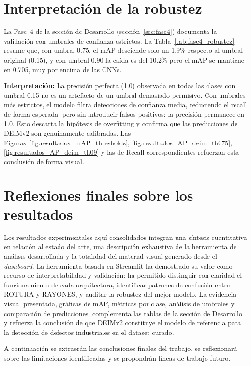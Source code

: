 \section{Interpretación de la robustez}
\label{sec:interpretacion_robustez}

La Fase~4 de la sección de Desarrollo (sección~\ref{sec:fase4}) documenta la validación con umbrales de confianza estrictos. La Tabla~\ref{tab:fase4_robustez} resume que, con umbral 0.75, el mAP desciende solo un 1.9\% respecto al umbral original (0.15), y con umbral 0.90 la caída es del 10.2\% pero el mAP se mantiene en 0.705, muy por encima de las CNNs.

\textbf{Interpretación:} La precisión perfecta (1.0) observada en todas las clases con umbral 0.15 no es un artefacto de un umbral demasiado permisivo. Con umbrales más estrictos, el modelo filtra detecciones de confianza media, reduciendo el recall de forma esperada, pero sin introducir falsos positivos: la precisión permanece en 1.0. Esto descarta la hipótesis de overfitting y confirma que las predicciones de DEIMv2 son genuinamente calibradas. Las Figuras~\ref{fig:resultados_mAP_thresholds}, \ref{fig:resultados_AP_deim_th075}, \ref{fig:resultados_AP_deim_th09} y las de Recall correspondientes refuerzan esta conclusión de forma visual.


\section{Reflexiones finales sobre los resultados}
\label{sec:reflexiones_finales}

Los resultados experimentales aquí consolidados integran una síntesis cuantitativa en relación al estado del arte, una descripción exhaustiva de la herramienta de análisis desarrollada y la totalidad del material visual generado desde el \textit{dashboard}. La herramienta basada en \acrshort{Streamlit} ha demostrado su valor como recurso de interpretabilidad y validación: ha permitido distinguir con claridad el funcionamiento de cada arquitectura, identificar patrones de confusión entre ROTURA y RAYONES, y auditar la robustez del mejor modelo. La evidencia visual presentada, gráficas de mAP, métricas por clase, análisis de umbrales y comparación de predicciones, complementa las tablas de la sección de Desarrollo y refuerza la conclusión de que DEIMv2 constituye el modelo de referencia para la detección de defectos industriales en el dataset curado.

A continuación se extraerán las conclusiones finales del trabajo, se reflexionará sobre las limitaciones identificadas y se propondrán líneas de trabajo futuro.
